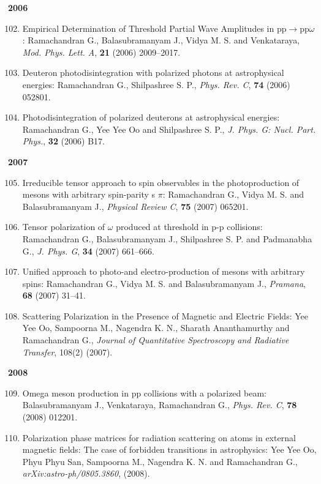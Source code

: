 \textbf{2006}
\begin{enumerate}
\setcounter{enumi}{101}
\item Empirical Determination of Threshold Partial Wave Amplitudes in pp$\to$pp$\omega$: Ramachandran G., Balasubramanyam J., Vidya M. S. and Venkataraya, \textit{Mod. Phys. Lett. A}, {\bf 21} (2006) 2009--2017.
\item Deuteron photodisintegration with polarized photons at astrophysical energies: Ramachandran G., Shilpashree S. P., \textit{Phys. Rev. C}, {\bf 74} (2006) 052801.
\item Photodisintegration of polarized deuterons at astrophysical energies: Ramachandran G., Yee Yee Oo and Shilpashree S. P., \textit{J. Phys. G: Nucl. Part. Phys.}, {\bf 32} (2006) B17.
\end{enumerate}
\textbf{2007}
\begin{enumerate}
\setcounter{enumi}{104}
\item Irreducible tensor approach to spin observables in the photoproduction of mesons with arbitrary spin-parity s $\pi$: Ramachandran G., Vidya M. S. and Balasubramanyam J., \textit{Physical Review C}, {\bf 75} (2007) 065201.
\item Tensor polarization of $\omega$ produced at threshold in p-p collisions: Ramachandran G., Balasubramanyam J., Shilpashree S. P. and Padmanabha G., \textit{J. Phys. G}, {\bf 34} (2007) 661--666.
\item Unified approach to photo-and electro-production of mesons with arbitrary spins: Ramachandran G., Vidya M. S. and Balasubramanyam J., \textit{Pramana}, {\bf 68} (2007) 31--41.
\item Scattering Polarization in the Presence of Magnetic and Electric Fields: Yee Yee Oo, Sampoorna M., Nagendra K. N., Sharath Ananthamurthy and Ramachandran G., \textit{Journal of Quantitative Spectroscopy and Radiative Transfer}, 108(2) (2007).
\end{enumerate}
\textbf{2008}
\begin{enumerate}
\setcounter{enumi}{108}
\item Omega meson production in pp collisions with a polarized beam: Balasubramanyam J., Venkataraya, Ramachandran G., \textit{Phys. Rev. C}, {\bf 78} (2008) 012201.
\item Polarization phase matrices for radiation scattering on atoms in external magnetic fields: The case of forbidden transitions in astrophysics: Yee Yee Oo, Phyu Phyu San, Sampoorna M., Nagendra K. N. and Ramachandran G., \textit{arXiv:astro-ph/0805.3860}, (2008).
\end{enumerate}
